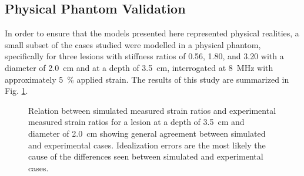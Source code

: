 		\subsection{Physical Phantom Validation}
			In order to ensure that the models presented here represented physical realities, a small subset of the cases studied were modelled in a physical phantom, specifically for three lesions with stiffness ratios of 0.56, 1.80, and 3.20 with a diameter of \SI{2.0}{\cm} and at a depth of \SI{3.5}{\cm}, interrogated at \SI{8}{\MHz} with approximately \SI{5}{\percent} applied strain. The results of this study are summarized in Fig. \ref{fig:phantom_validation}.

			\begin{figure}[!t]
				\centering
				\caption[Experimental validation of quasi-static model results]{Relation between simulated measured strain ratios and experimental measured strain ratios for a lesion at a depth of \SI{3.5}{\cm} and diameter of \SI{2.0}{\cm} showing general agreement between simulated and experimental cases. Idealization errors are the most likely the cause of the differences seen between simulated and experimental cases.}
				\label{fig:phantom_validation}
			\end{figure}

